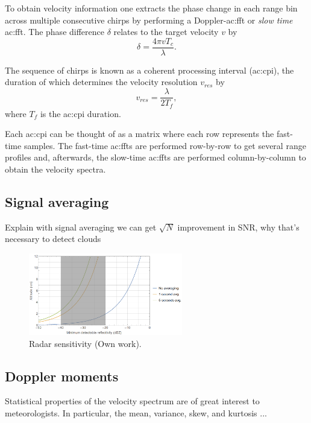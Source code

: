 \documentclass{article}
\begin{document}
To obtain velocity information one extracts the phase change in each range bin across multiple consecutive chirps by performing a Doppler-\acrshort{ac:fft} or \textit{slow time} \acrshort{ac:fft}.
The phase difference \(\delta\) relates to the target velocity \(v\) by\supercite{TIFMCWDoppler}
\begin{equation}
	\delta = \frac{4 \pi v T_c}{\lambda}.
\end{equation}

The sequence of chirps is known as a coherent processing interval (\acrshort{ac:cpi}), the duration of which determines the velocity resolution \(v_{res}\) by
\begin{equation}
	v_{res} = \frac{\lambda}{2 T_f},
\end{equation}
where \(T_f\) is the \acrshort{ac:cpi} duration.

Each \acrshort{ac:cpi} can be thought of as a matrix where each row represents the fast-time samples. The fast-time \acrshort{ac:fft}s are performed row-by-row to get several range profiles and, afterwards, the slow-time \acrshort{ac:fft}s are performed column-by-column to obtain the velocity spectra.

\subsection{Signal averaging}
Explain with signal averaging we can get \(\sqrt{N}\) improvement in SNR, why that's necessary to detect clouds

\begin{figure}
	\centering
	\includegraphics[width=0.6\textwidth]{sensitivity}
	\caption{Radar sensitivity (Own work).}
	\label{fig:Sensitivity}
\end{figure}

\subsection{Doppler moments}
Statistical properties of the velocity spectrum are of great interest to meteorologists. In particular, the mean, variance, skew, and kurtosis ...
\end{document}
